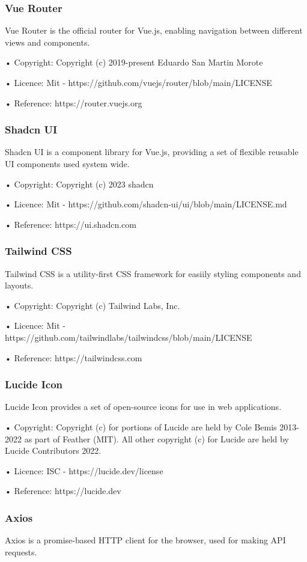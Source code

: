 \subsubsection{Vue Router}
Vue Router is the official router for Vue.js, enabling navigation between different views and components.

• Copyright: Copyright (c) 2019-present Eduardo San Martin Morote

• Licence: Mit -  https://github.com/vuejs/router/blob/main/LICENSE

• Reference:  https://router.vuejs.org

\subsubsection{Shadcn UI}
Shadcn UI is a component library for Vue.js, providing a set of flexible reusable UI components used system wide.

• Copyright: Copyright (c) 2023 shadcn

• Licence: Mit -  https://github.com/shadcn-ui/ui/blob/main/LICENSE.md

• Reference:  https://ui.shadcn.com

\subsubsection{Tailwind CSS}
Tailwind CSS is a utility-first CSS framework for easiily styling components and layouts.

• Copyright: Copyright (c) Tailwind Labs, Inc.

• Licence: Mit -  https://github.com/tailwindlabs/tailwindcss/blob/main/LICENSE

• Reference:  https://tailwindcss.com

\subsubsection{Lucide Icon}
Lucide Icon provides a set of open-source icons for use in web applications.

• Copyright: Copyright (c) for portions of Lucide are held by Cole Bemis 2013-2022 as part of Feather (MIT). All other copyright (c) for Lucide are held by Lucide Contributors 2022.

• Licence: ISC -  https://lucide.dev/license

• Reference:  https://lucide.dev

\subsubsection{Axios}
Axios is a promise-based HTTP client for the browser, used for making API requests.

